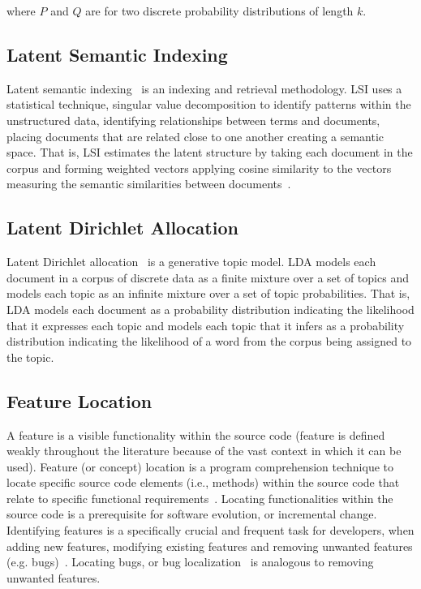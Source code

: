 where $P$ and $Q$ are for two discrete probability distributions of length $k$.

\subsection{Latent Semantic Indexing}

Latent semantic indexing~\cite{Deerwester-etal:1990} is an indexing and
retrieval methodology. LSI uses a statistical technique, singular value
decomposition to identify patterns within the unstructured data, identifying
relationships between terms and documents, placing documents that are related
close to one another creating a semantic space. That is, LSI estimates the
latent structure by taking each document in the corpus and forming weighted
vectors applying cosine similarity to the vectors measuring the semantic
similarities between documents~\cite{Binkley-Lawrie:2010}.

\subsection{Latent Dirichlet Allocation}

Latent Dirichlet allocation~\cite{Blei-etal:2003} is a generative topic model.
LDA models each document in a corpus of discrete data as a finite mixture over
a set of topics and models each topic as an infinite mixture over a set of
topic probabilities.  That is, LDA models each document as a probability
distribution indicating the likelihood that it expresses each topic and models
each topic that it infers as a probability distribution indicating the
likelihood of a word from the corpus being assigned to the topic.


\subsection{Feature Location} 

A feature \cite{Biggerstaff} is a visible functionality within the source code
(feature is defined weakly throughout the literature because of the vast
context in which it can be used). Feature (or concept) location is a program
comprehension technique to locate specific source code elements (i.e., methods)
within the source code that relate to specific functional
requirements~\cite{972777, biggers2014configuring}. Locating functionalities
within the source code is a prerequisite for software evolution, or incremental
change.  Identifying features is a specifically crucial and frequent task for
developers, when adding new features, modifying existing features and removing
unwanted features (e.g.  bugs)~\cite{1309648, dit2013feature}. Locating bugs,
or bug localization~\cite{4656405} is analogous to removing unwanted features.    

